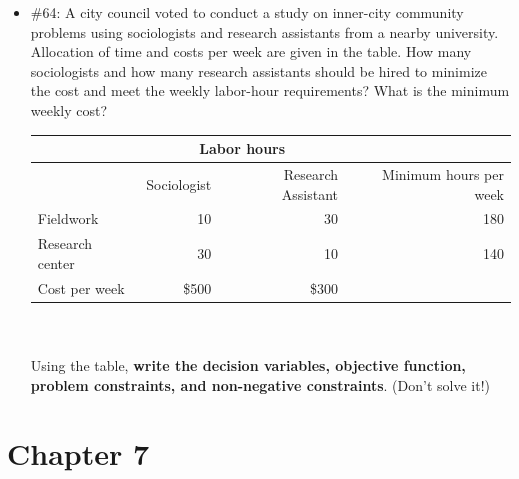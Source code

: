 \documentclass[12pt]{article}
\begin{document}
\begin{itemize}
\begin{itemize}
\cleardoublepage
\item \#64: A city council voted to conduct a study on inner-city community problems using sociologists and research assistants from a nearby university. Allocation of time and costs per week are given in the table. How many sociologists and how many research assistants should be hired to minimize the cost and meet the weekly labor-hour requirements? What is the minimum weekly cost? \\
\begin{tabular}{|l|r|r|r|}
	\hline
	& \multicolumn{2}{|c|}{Labor hours} & \\
	\hline
	& Sociologist & Research Assistant & Minimum hours per week \\
	\hline
	Fieldwork & 10 & 30 & 180 \\
	\hline
	Research center &30 & 10 & 140 \\
	\hline
	Cost per week & \$500 & \$300 &  \\
	\hline
\end{tabular}
\\\\ Using the  table, \textbf{write the decision variables, objective function, problem constraints, and non-negative constraints}. (Don't solve it!)


\end{itemize}

\end{itemize}


\section*{Chapter 7}
\end{document}
